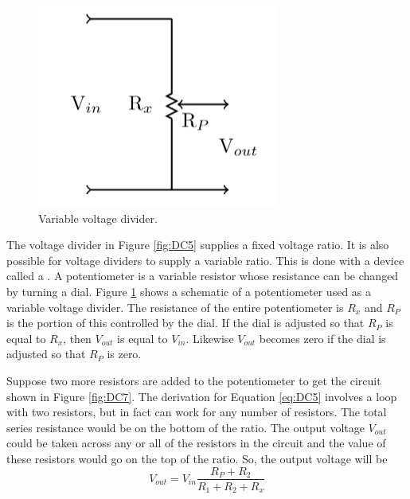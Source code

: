 \begin{figure}[H]
    \centering
    \includegraphics[scale = 0.8]{Images/DC6.PNG}
    \caption{Variable voltage divider.}
    \label{fig:DC6}
\end{figure}

The voltage divider in Figure \ref{fig:DC5} supplies a fixed voltage ratio. It is also possible for voltage dividers to supply a variable ratio. This is done with a device called a . A potentiometer is a variable resistor whose resistance can be changed by turning a dial. Figure \ref{fig:DC6} shows a schematic of a potentiometer used as a variable voltage divider. The resistance of the entire potentiometer is $R_x$ and $R_P$ is the portion of this controlled by the dial. If the dial is adjusted so that $R_P$ is equal to $R_x$, then $V_{out}$ is equal to $V_{in}$. Likewise $V_{out}$ becomes zero if the dial is adjusted so that $R_P$ is zero.

\noindent Suppose two more resistors are added to the potentiometer to get the circuit shown in Figure \ref{fig:DC7}. The derivation for Equation \ref{eq:DC5} involves a loop with two resistors, but in fact can work for any number of resistors. The total series resistance would be on the bottom of the ratio. The output voltage $V_{out}$ could be taken across any or all of the resistors in the circuit and the value of these resistors would go on the top of the ratio. So, the output voltage will be \begin{equation}\label{eq:DC6}
    V_{out} = V_{in}\frac{R_P+R_2}{R_1+R_2+R_x}
\end{equation}


